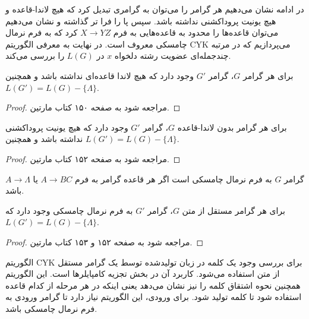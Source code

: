 \documentclass[main.tex]{subfiles}
\begin{document}
	 در ادامه نشان می‌دهیم هر گرامر را می‌توان به گرامری تبدیل کرد که هیچ لاندا-قاعده و هیچ یونیت پروداکشنی نداشته باشد. سپس پا را فرا تر گذاشته و نشان می‌دهیم می‌توان قاعده‌ها را محدود به قاعده‌هایی به فرم 
	 $X \rightarrow YZ$
	 کرد که به فرم نرمال چامسکی
	  معروف است. در نهایت به معرفی الگوریتم CYK 
	 می‌پردازیم که در مرتبه چندجمله‌ای
	  عضویت رشته دلخواه
	 $x$
	 در 
	 $L(G)$
	 را بررسی می‌کند.
	 \begin{theorem}
	 	برای هر گرامر $G$، گرامر $G'$ وجود دارد که هیچ لاندا قاعده‌ای نداشته باشد و همچنین
	 	$L(G') = L(G) - \{\Lambda\}$.
	 \end{theorem}
 	\begin{proof}
 		مراجعه شود به صفحه ۱۵۰ کتاب مارتین.
 	\end{proof}
	  \begin{theorem}
	 	برای هر گرامر بدون لاندا-قاعده $G$، گرامر $G'$ وجود دارد که هیچ یونیت پروداکشنی نداشته باشد و همچنین
	 	$L(G') = L(G) - \{\Lambda\}$.
	 \end{theorem}
	 \begin{proof}
	 	مراجعه شود به صفحه ۱۵۲ کتاب مارتین.
	 \end{proof}
 \begin{definition}
 	\label{chomsky}
 	گرامر $G$ به فرم نرمال چامسکی است اگر هر قاعده گرامر به فرم 
 	$A \rightarrow BC$
 	یا 
 	 $A \rightarrow \Lambda$
 	 باشد.
 \end{definition}
	  \begin{theorem}
	برای هر گرامر مستقل از متن $G$، گرامر $G'$ به فرم نرمال چامسکی وجود دارد که 
	$L(G') = L(G) - \{\Lambda\}$.
\end{theorem}
	\begin{proof}
	مراجعه شود به صفحه ۱۵۲ و ۱۵۳ کتاب مارتین.
\end{proof}
	الگوریتم 
	CYK
	برای بررسی وجود یک کلمه در زبان تولیدشده توسط یک گرامر مستقل از متن استفاده می‌شود. کاربرد آن در بخش تجزیه 
	کامپایلرها است. این الگوریتم همچنین نحوه اشتقاق کلمه را نیز نشان می‌دهد یعنی اینکه در هر مرحله از کدام قاعده استفاده شود تا کلمه تولید شود. برای ورودی، این الگوریتم نیاز دارد تا گرامر ورودی به فرم نرمال چامسکی باشد. 
	
\end{document}
